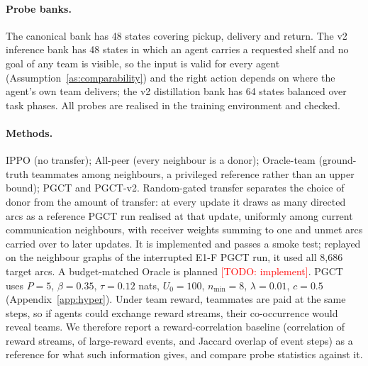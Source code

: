 \documentclass{article}
\theoremstyle{remark}
\newcommand{\todo}[1]{\textcolor{red}{[TODO: #1]}}
\newcommand{\ours}{PGCT}
\begin{document}
\begin{table}[t]
\centering
\small
{}
\caption{Tasks placed on the two axes of the analysis. E1: identifiability ruled out by Proposition~\ref{prop:nonid}, and in
frozen curriculum models blending with a non-teammate's critic helped more than blending with a teammate's. E1-F, B, A:
identifiability expected from the goal layout; compatibility to be measured \todo{place B after measurement}.}
\label{tab:axes}
\end{table}

\paragraph{Probe banks.} The canonical bank has 48 states covering pickup, delivery and return. The v2 inference bank has 48
states in which an agent carries a requested shelf and no goal of any team is visible, so the input is valid for every agent
(Assumption~\ref{as:comparability}) and the right action depends on where the agent's own team delivers; the v2 distillation
bank has 64 states balanced over task phases. All probes are realised in the training environment and checked.

\paragraph{Methods.} IPPO (no transfer); All-peer (every neighbour is a donor); Oracle-team (ground-truth teammates among
neighbours, a privileged reference rather than an upper bound); \ours{} and \ours{}-v2. Random-gated transfer separates the
choice of donor from the amount of transfer: at every update it draws as many directed arcs as a reference \ours{} run
realised at that update, uniformly among current communication neighbours, with receiver weights summing to one and
unmet arcs carried over to later updates. It is implemented and passes a smoke test; replayed on the neighbour graphs of the
interrupted E1-F \ours{} run, it used all 8{,}686 target arcs. A budget-matched Oracle is planned \todo{implement}.
\ours{} uses $P=5$, $\beta=0.35$, $\tau=0.12$ nats, $U_0=100$, $n_{\min}=8$, $\lambda=0.01$, $c=0.5$ (Appendix~\ref{app:hyper}). Under team
reward, teammates are paid at the same steps, so if agents could exchange reward streams, their co-occurrence would reveal
teams. We therefore report a reward-correlation baseline (correlation of reward streams, of large-reward events, and Jaccard
overlap of event steps) as a reference for what such information gives, and compare probe statistics against it.
\end{document}

